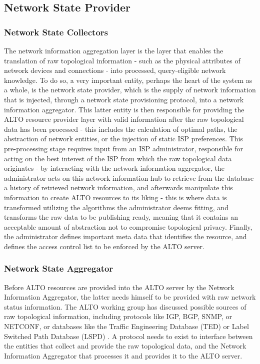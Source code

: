 \subsection{Network State Provider}

\subsubsection{Network State Collectors}

    The network information aggregation layer is the layer that enables the translation of raw topological information - such as the physical attributes of network devices and connections - into processed, query-eligible network knowledge.
    To do so, a very important entity, perhaps the heart of the system as a whole, is the network state provider, which is the supply of network information that is injected, through a network state provisioning protocol, into a network information aggregator.
    This latter entity is then responsible for providing the ALTO resource provider layer with valid information after the raw topological data has been processed - this includes the calculation of optimal paths, the abstraction of network entities, or the injection of static ISP preferences.
    This pre-processing stage requires input from an ISP administrator, responsible for acting on the best interest of the ISP from which the raw topological data originates - by interacting with the network information aggregator, the administrator acts on this network information hub to retrieve from the database a history of retrieved network information, and afterwards manipulate this information to create ALTO resources to its liking - this is where data is transformed utilizing the algorithms the administrator deems fitting, and transforms the raw data to be publishing ready, meaning that it contains an acceptable amount of abstraction not to compromise topological privacy.
    Finally, the administrator defines important meta data that identifies the resource, and defines the access control list to be enforced by the ALTO server.

\subsubsection{Network State Aggregator}

    Before ALTO resources are provided into the ALTO server by the Network Information Aggregator, the latter needs himself to be provided with raw network status information.
    The ALTO working group has discussed possible sources of raw topological information, including protocols like IGP, BGP, SNMP, or NETCONF, or databases like the Traffic Engineering Database (TED) or Label Switched Path Database (LSPD) \cite{alto-deployment-considerations}.
    A protocol needs to exist to interface between the entities that collect and provide the raw topological data, and the Network Information Aggregator that processes it and provides it to the ALTO server.

